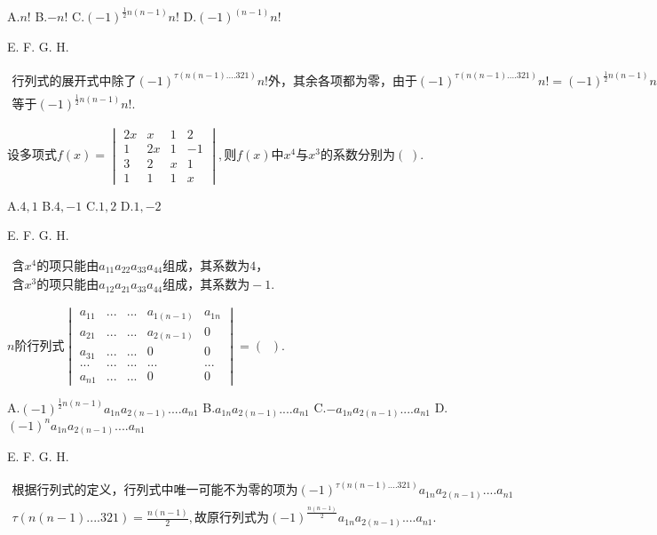A.$n!$   B.$-n!$   C.$(-1)^{{\textstyle\frac12}n(n-1)}n!$   D.$(-1)^{\textstyle(n-1)}n!$

E.   F.   G.   H.

$\begin{array}{l}\mathrm{行列式的展开式中除了}(-1)^{\textstyle\tau(n(n-1)....321)}n!外，\mathrm{其余各项都为零}，\mathrm{由于}(-1)^{\textstyle\tau(n(n-1)....321)}n!=(-1)^{{\textstyle\frac12}n(n-1)}n!,\mathrm{故原行列式}\\\mathrm{等于}(-1)^{\textstyle\frac12n(n-1)}n!.\end{array}$


$\mathrm{设多项式}f(x)=\begin{vmatrix}2x&x&1&2\\1&2x&1&-1\\3&2&x&1\\1&1&1&x\end{vmatrix},则f(x)中x^4与x^3\mathrm{的系数分别为}(\;).$

A.$4,1$   B.$4,-1$   C.$1,2$   D.$1,-2$

E.   F.   G.   H.

$\begin{array}{l}含x^4\mathrm{的项只能由}a_{11}a_{22}a_{33}a_{44}\mathrm{组成}，\mathrm{其系数为}4，\\含x^3\mathrm{的项只能由}a_{12}a_{21}a_{33}a_{44}\mathrm{组成}，\mathrm{其系数为}-1.\end{array}$


$n\mathrm{阶行列式}\begin{vmatrix}a_{11}&...&...&a_{1(n-1)}&a_{1n}\\a_{21}&...&...&a_{2(n-1)}&0\\a_{31}&...&...&0&0\\...&...&...&...&...\\a_{n1}&...&...&0&0\end{vmatrix}=(\;\;).$

A.$(-1)^{{\textstyle\frac12}n(n-1)}a_{1n}a_{2(n-1)}....a_{n1}$   B.$a_{1n}a_{2(n-1)}....a_{n1}$   C.$-a_{1n}a_{2(n-1)}....a_{n1}$   D.$(-1)^na_{1n}a_{2(n-1)}....a_{n1}$

E.   F.   G.   H.

$\begin{array}{l}\mathrm{根据行列式的定义}，\mathrm{行列式中唯一可能不为零的项为}(-1)^{\tau(n(n-1)....321)}a_{1n}a_{2(n-1)}....a_{n1}\\\tau(n(n-1)....321)=\frac{n(n-1)}2,\mathrm{故原行列式为}(-1)^\frac{n(n-1)}2a_{1n}a_{2(n-1)}....a_{n1}.\end{array}$


